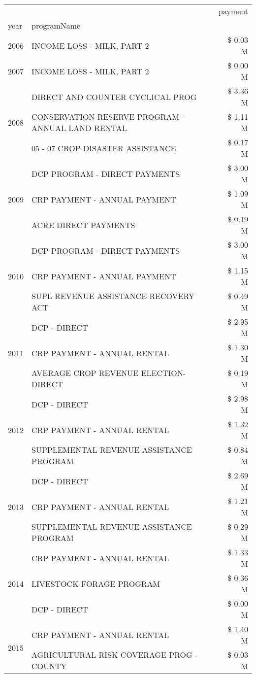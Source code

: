 \begin{tabular}{llr}
\toprule
 &  & payment \\
year & programName &  \\
\midrule
2006 & INCOME LOSS - MILK, PART 2 & \$ 0.03 M \\
\cline{1-3}
2007 & INCOME LOSS - MILK, PART 2 & \$ 0.00 M \\
\cline{1-3}
\multirow[t]{3}{*}{2008} & DIRECT AND COUNTER CYCLICAL PROG & \$ 3.36 M \\
 & CONSERVATION RESERVE PROGRAM - ANNUAL LAND RENTAL & \$ 1.11 M \\
 & 05 - 07 CROP DISASTER ASSISTANCE & \$ 0.17 M \\
\cline{1-3}
\multirow[t]{3}{*}{2009} & DCP PROGRAM - DIRECT PAYMENTS & \$ 3.00 M \\
 & CRP PAYMENT - ANNUAL PAYMENT & \$ 1.09 M \\
 & ACRE DIRECT PAYMENTS & \$ 0.19 M \\
\cline{1-3}
\multirow[t]{3}{*}{2010} & DCP PROGRAM - DIRECT PAYMENTS & \$ 3.00 M \\
 & CRP PAYMENT - ANNUAL PAYMENT & \$ 1.15 M \\
 & SUPL REVENUE ASSISTANCE RECOVERY ACT & \$ 0.49 M \\
\cline{1-3}
\multirow[t]{3}{*}{2011} & DCP - DIRECT & \$ 2.95 M \\
 & CRP PAYMENT - ANNUAL RENTAL & \$ 1.30 M \\
 & AVERAGE CROP REVENUE ELECTION-DIRECT & \$ 0.19 M \\
\cline{1-3}
\multirow[t]{3}{*}{2012} & DCP - DIRECT & \$ 2.98 M \\
 & CRP PAYMENT - ANNUAL RENTAL & \$ 1.32 M \\
 & SUPPLEMENTAL REVENUE ASSISTANCE PROGRAM & \$ 0.84 M \\
\cline{1-3}
\multirow[t]{3}{*}{2013} & DCP - DIRECT & \$ 2.69 M \\
 & CRP PAYMENT - ANNUAL RENTAL & \$ 1.21 M \\
 & SUPPLEMENTAL REVENUE ASSISTANCE PROGRAM & \$ 0.29 M \\
\cline{1-3}
\multirow[t]{3}{*}{2014} & CRP PAYMENT - ANNUAL RENTAL & \$ 1.33 M \\
 & LIVESTOCK FORAGE PROGRAM & \$ 0.36 M \\
 & DCP - DIRECT & \$ 0.00 M \\
\cline{1-3}
\multirow[t]{3}{*}{2015} & CRP PAYMENT - ANNUAL RENTAL & \$ 1.40 M \\
 & AGRICULTURAL RISK COVERAGE PROG - COUNTY & \$ 0.03 M \\

\end{tabular}
